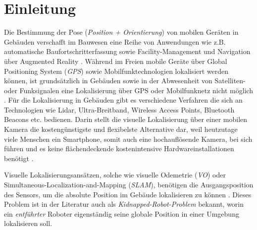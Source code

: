 
\section{Einleitung}
%
%
%
%
%
%
%
%
%
%
%
%
%
%



Die Bestimmung der Pose (\textit{Position + Orientierung}) von mobilen Geräten in Gebäuden verschafft im Bauwesen eine Reihe von Anwendungen wie z.B. automatische Baufortschritterfassung sowie Facility-Management und Navigation über Augmented Reality \cite{kroppModelbasedPoseEstimation2016, kochNaturalMarkersAugmented2014}.
Während im Freien mobile Geräte über Global Positioning System (\textit{GPS}) sowie Mobilfunktechnologien lokalisiert werden können, ist grundsätzlich in Gebäuden sowie in der Abwesenheit von Satelliten- oder Funksignalen eine Lokalisierung über GPS oder Mobilfunknetz nicht möglich \cite{yassinRecentAdvancesIndoor2016}. Für die Lokalisierung in Gebäuden gibt es verschiedene Verfahren die sich an Technologien wie Lidar, Ultra-Breitband, Wireless Access Points, Bluetooth Beacons etc. bedienen. Darin stellt die visuelle Lokalisierung über einer mobilen Kamera die kostengünstigste und flexibelste Alternative dar, weil heutzutage viele Menschen ein Smartphone, somit auch eine hochauflösende Kamera, bei sich führen und es keine flächendeckende kostenintensive Hardwareinstallationen benötigt \cite{wuImageBasedCamera2016}.

Visuelle Lokalisierungsansätzen, solche wie 
visuelle Odemetrie (\textit{VO}) oder Simultaneous-Localization-and-Mapping (\textit{SLAM}), benötigen die Ausgangsposition des Sensors, um die absolute Position im Gebäude lokalisieren zu können \cite{stephenseGlobalLocalizationUsing2002}. Dieses Problem ist in der Literatur auch als \textit{Kidnapped-Robot-Problem} bekannt, worin ein \textit{entführter} Roboter eigenständig seine globale Position in einer Umgebung lokalisieren soll.


